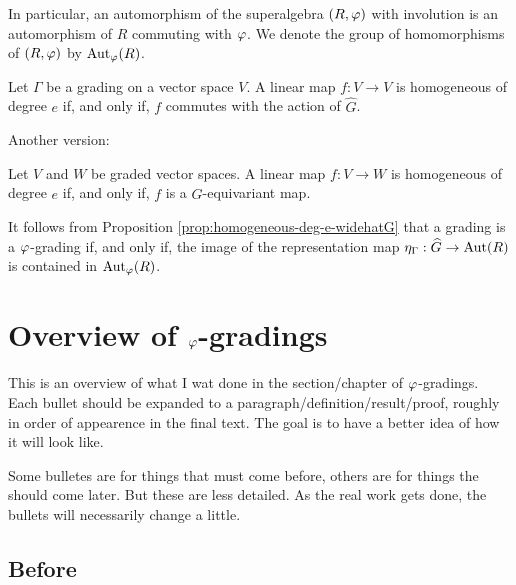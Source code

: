 \documentclass{amsbook}
\begin{document}
In particular, an automorphism of the superalgebra $(R, \varphi)$ with involution is an automorphism of $R$ commuting with $\varphi$. We denote the group of homomorphisms of $(R, \varphi)$ by $\operatorname{Aut}_\varphi(R)$.

\begin{prop}
    Let $\Gamma$ be a grading on a vector space $V$. A linear map $f: V \to V$ is homogeneous of degree $e$ if, and only if, $f$ commutes with the action of $\widehat G$.
\end{prop}

Another version:

\begin{prop}\label{prop:homogeneous-deg-e-widehatG}
    Let $V$ and $W$ be graded vector spaces. A linear map $f: V \to W$ is homogeneous of degree $e$ if, and only if, $f$ is a $\widehat G$-equivariant map.
\end{prop}

It follows from Proposition \ref{prop:homogeneous-deg-e-widehatG} that a grading is a $\varphi$-grading if, and only if, the image of the representation map $\eta_\Gamma: \widehat G \to \operatorname{Aut} (R)$ is contained in $\operatorname{Aut}_\varphi(R)$.



\chapter{Overview of $\varphi$-gradings}

This is an overview of what I wat done in the section/chapter of $\varphi$-gradings. Each bullet should be expanded to a paragraph/definition/result/proof, roughly in order of appearence in the final text. The goal is to have a better idea of how it will look like.

Some bulletes are for things that must come before, others are for things the should come later. But these are less detailed. As the real work gets done, the bullets will necessarily change a little.

\section{Before}
\end{document}
